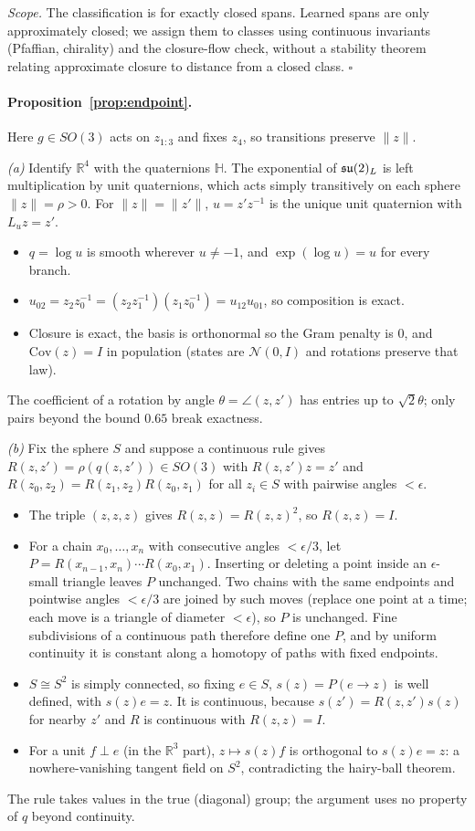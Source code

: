 \emph{Scope.} The classification is for exactly closed spans. Learned spans are only approximately closed; we assign
them to classes using continuous invariants (Pfaffian, chirality) and the closure-flow check, without a stability
theorem relating approximate closure to distance from a closed class. $\square$

\paragraph{Proposition~\ref{prop:endpoint}.}
Here $g\in SO(3)$ acts on $z_{1:3}$ and fixes $z_4$, so transitions preserve $\|z\|$.

\emph{(a)} Identify $\mathbb R^4$ with the quaternions $\mathbb H$. The exponential of $\mathfrak{su}(2)_L$ is left
multiplication by unit quaternions, which acts simply transitively on each sphere $\|z\|=\rho>0$. For
$\|z\|=\|z'\|$, $u=z'z^{-1}$ is the unique unit quaternion with $L_uz=z'$.
\begin{itemize}
\item $q=\log u$ is smooth wherever $u\neq-1$, and $\exp(\log u)=u$ for every branch.
\item $u_{02}=z_2z_0^{-1}=(z_2z_1^{-1})(z_1z_0^{-1})=u_{12}u_{01}$, so composition is exact.
\item Closure is exact, the basis is orthonormal so the Gram penalty is $0$, and $\mathrm{Cov}(z)=I$ in population
(states are $\mathcal N(0,I)$ and rotations preserve that law).
\end{itemize}
The coefficient of a rotation by angle $\theta=\angle(z,z')$ has entries up to $\sqrt2\theta$; only pairs beyond the
bound $0.65$ break exactness.

\emph{(b)} Fix the sphere $S$ and suppose a continuous rule gives $R(z,z')=\rho(q(z,z'))\in SO(3)$ with
$R(z,z')z=z'$ and $R(z_0,z_2)=R(z_1,z_2)R(z_0,z_1)$ for all $z_i\in S$ with pairwise angles $<\epsilon$.
\begin{itemize}
\item The triple $(z,z,z)$ gives $R(z,z)=R(z,z)^2$, so $R(z,z)=I$.
\item For a chain $x_0,\dots,x_n$ with consecutive angles $<\epsilon/3$, let $P=R(x_{n-1},x_n)\cdots R(x_0,x_1)$.
Inserting or deleting a point inside an $\epsilon$-small triangle leaves $P$ unchanged. Two chains with the same
endpoints and pointwise angles $<\epsilon/3$ are joined by such moves (replace one point at a time; each move is a
triangle of diameter $<\epsilon$), so $P$ is unchanged. Fine subdivisions of a continuous path therefore define one
$P$, and by uniform continuity it is constant along a homotopy of paths with fixed endpoints.
\item $S\cong S^2$ is simply connected, so fixing $e\in S$, $s(z)=P(e\to z)$ is well defined, with $s(z)e=z$.
It is continuous, because $s(z')=R(z,z')s(z)$ for nearby $z'$ and $R$ is continuous with $R(z,z)=I$.
\item For a unit $f\perp e$ (in the $\mathbb R^3$ part), $z\mapsto s(z)f$ is orthogonal to $s(z)e=z$: a
nowhere-vanishing tangent field on $S^2$, contradicting the hairy-ball theorem.
\end{itemize}
The rule takes values in the true (diagonal) group; the argument uses no property of $q$ beyond continuity.


